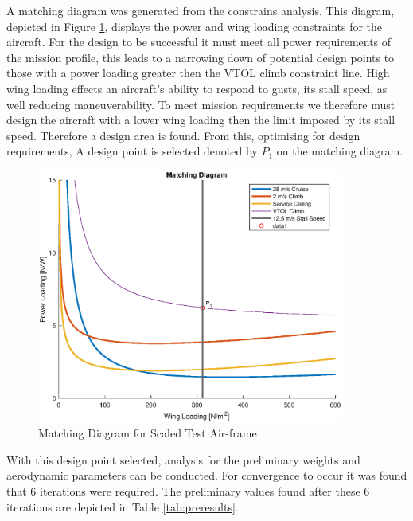 A matching diagram was generated from the constrains analysis. This diagram, depicted in Figure \ref{fig:matchingdaig}, displays the power and wing loading constraints for the aircraft. For the design to be successful it must meet all power requirements of the mission profile, this leads to a narrowing down of potential design points to those with a power loading greater then the VTOL climb constraint line. High wing loading effects an aircraft's ability to respond to gusts, its stall speed, as well reducing maneuverability. To meet mission requirements we therefore must design the aircraft with a lower wing loading then the limit imposed by its stall speed. Therefore a design area is found. From this, optimising for design requirements, A design point is selected denoted by $P_1$ on the matching diagram.

\begin{figure}[H]
    \centering
    \includegraphics[width = 0.9\textwidth]{PrelimSizing/matching1.eps}
    \caption{Matching Diagram for Scaled Test Air-frame}
    \label{fig:matchingdaig}
\end{figure}

With this design point selected, analysis for the preliminary weights and aerodynamic parameters can be conducted. For convergence to occur it was found that 6 iterations were required. The preliminary values found after these 6 iterations are depicted in Table \ref{tab:preresults}.

